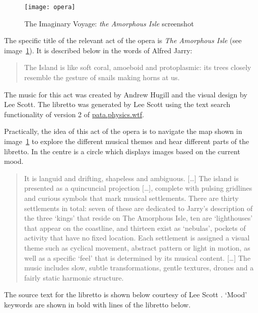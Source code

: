 \begin{figure}[!htbp]
  \centering
  \texttt{[image: opera]}
\caption[Imaginary Voyage: \textit{Amorphous Isle}]{The Imaginary Voyage: \textit{the Amorphous Isle} screenshot}
\label{img:opera}
\end{figure}

The specific title of the relevant act of the opera is \textit{The Amorphous Isle} \autocite{Hugill2014a} (see image~\ref{img:opera}). It is described below in the words of Alfred Jarry:

\begin{quotation}
  The Island is like soft coral, amoeboid and protoplasmic: its trees closely resemble the gesture of snails making horns at us. 
\end{quotation}

The music for this act was created by Andrew Hugill and the visual design by Lee Scott. The libretto was generated by Lee Scott using the text search functionality of version 2 of \url{pata.physics.wtf}.

Practically, the idea of this act of the opera is to navigate the map shown in image~\ref{img:opera} to explore the different musical themes and hear different parts of the libretto. In the centre is a circle which displays images based on the current mood.

\begin{quotation}
  It is languid and drifting, shapeless and ambiguous. [\ldots] The island is presented as a quincuncial projection [\ldots], complete with pulsing gridlines and curious symbols that mark musical settlements. There are thirty settlements in total: seven of these are dedicated to Jarry's description of the three `kings' that reside on The Amorphous Isle, ten are `lighthouses' that appear on the coastline, and thirteen exist as `nebulas', pockets of activity that have no fixed location. Each settlement is assigned a visual theme such as cyclical movement, abstract pattern or light in motion, as well as a specific `feel' that is determined by its musical content. [\ldots] The music includes slow, subtle transformations, gentle textures, drones and a fairly static harmonic structure. 
\end{quotation}

The source text for the libretto is shown below courtesy of Lee Scott \autocite*{Scott2014}. `Mood' keywords are shown in bold with lines of the libretto below.

